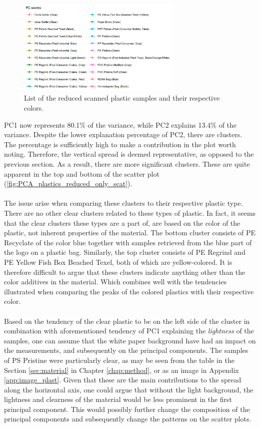 \begin{figure}[H]
    \centering
    \includegraphics[width=0.7\textwidth]{Images/results/PCA_plastics_reduced_list.png}
    \caption{List of the reduced scanned plastic samples and their respective colors.}
    \label{fig:PCA_plastics_reduced_list}
\end{figure}
\noindent
PC1 now represents 80.1\% of the variance, while PC2 explains 13.4\% of the variance. Despite the lower explanation percentage of PC2, there are clusters. The percentage is sufficiently high to make a contribution in the plot worth noting. Therefore, the vertical spread is deemed representative, as opposed to the previous section. As a result, there are more significant clusters. These are quite apparent in the top and bottom of the scatter plot (\ref{fig:PCA_plastics_reduced_only_scat}). 
\\\\
The issue arise when comparing these clusters to their respective plastic type. There are no other clear clusters related to these types of plastic. In fact, it seems that the clear clusters these types are a part of, are based on the color of the plastic, not inherent properties of the material. The bottom cluster consists of PE Recyclate of the color blue together with samples retrieved from the blue part of the logo on a plastic bag. Similarly, the top cluster consists of PE Regrind and PE Yellow Fish Box Beached Texel, both of which are yellow-colored. It is therefore difficult to argue that these clusters indicate anything other than the color additives in the material. Which combines well with the tendencies illustrated when comparing the peaks of the colored plastics with their respective color.
\\\\
Based on the tendency of the clear plastic to be on the left side of the cluster in combination with aforementioned tendency of PC1 explaining the \textit{lightness} of the samples, one can assume that the white paper background have had an impact on the measurements, and subsequently on the principal components. The samples of PS Pristine were particularly clear, as may be seen from the table in the Section \ref{sec:material} in Chapter \ref{chap:method}, or as an image in Appendix \ref{app:image_plast}. Given that these are the main contributions to the spread along the horizontal axis, one could argue that without the light background, the lightness and clearness of the material would be less prominent in the first principal component. This would possibly further change the composition of the principal components and subsequently change the patterns on the scatter plots. 
